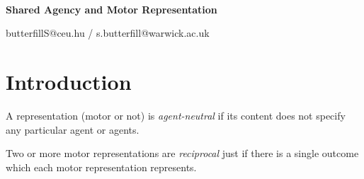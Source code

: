 \documentclass[11pt]{extarticle}
\date{}
\begin{document}
\begin{multicols}{3}

\setlength\footnotesep{1em}






\

\begin{center}
{\Large
\textbf{Shared Agency and Motor Representation}
}


butterfillS@ceu.hu / s.butterfill@warwick.ac.uk

\end{center}
%
%
%

\section{Introduction}
A representation (motor or not) is \emph{agent-neutral} if its content does not specify any particular agent or agents.


Two or more motor representations are \emph{reciprocal} just if there is a single outcome which each motor representation represents.


\end{multicols}
\end{document}
